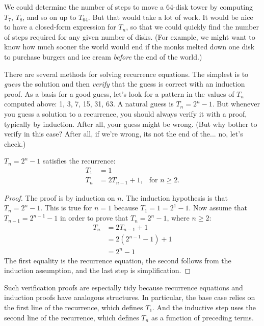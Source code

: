 We could determine the number of steps to move a 64-disk tower by
computing $T_7$, $T_8$, and so on up to $T_{64}$.  But that would take
a lot of work.  It would be nice to have a closed-form expression for
$T_n$, so that we could quickly find the number of steps required for
any given number of disks. (For example, we might want to know how
much sooner the world would end if the monks melted down one disk to
purchase burgers and ice cream \emph{before} the end of the world.)

There are several methods for solving recurrence equations.  The
simplest is to  \emph{guess} the solution and
then \emph{verify} that the guess is correct with an induction proof.
As a basis for a good guess, let's look for a pattern in the values of
$T_n$ computed above: 1, 3, 7, 15, 31, 63.  A natural guess is $T_n =
2^n - 1$.  But whenever you guess a solution to a recurrence, you
should always verify it with a proof, typically by induction.  After
all, your guess might be wrong. (But why bother to verify in this
case?  After all, if we're wrong, its not the end of the... no, let's
check.)

\begin{claim}
$T_n = 2^n - 1$ satisfies the recurrence:
\begin{align*}
T_1 & = 1 \\
T_n & = 2T_{n-1} + 1, & \text{for $n \geq 2$}.
\end{align*}
\end{claim}
\begin{proof}
  The proof is by induction on $n$.  The induction hypothesis is that
  $T_n = 2^n - 1$.  This is true for $n = 1$ because $T_1 = 1 = 2^1 -
  1$.  Now assume that $T_{n-1} = 2^{n-1} - 1$ in order to prove
  that $T_n = 2^n - 1$, where $n \geq 2$:
\begin{align*}
T_{n} & = 2 T_{n-1} + 1 \\
  & = 2 (2^{n-1} - 1) + 1 \\
  & = 2^n - 1
\end{align*}
The first equality is the recurrence equation, the second follows from
the induction assumption, and the last step is simplification.
\end{proof}

Such verification proofs are especially tidy because recurrence
equations and induction proofs have analogous structures.  In
particular, the base case relies on the first line of the recurrence,
which defines $T_1$.  And the inductive step uses the second line of
the recurrence, which defines $T_n$ as a function of preceding terms.

